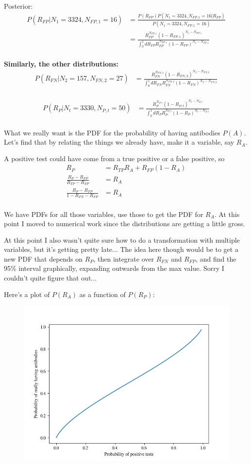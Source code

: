 Posterior:
\begin{align*}
    P(R_{FP}|N_1=3324, N_{FP,1}=16) &= \frac{P(R_{FP}) P(N_1=3324, N_{FP,1}=16 | R_{FP})}{P(N_1=3324, N_{FP,1}=16)} \\
    &= \frac{R_{FP}^{N_{FP,1}} (1-R_{FP,1})^{N_1-N_{FP,1}}}{\int_0^1 dR_{FP} R_{FP}^{N_{FP,1}} (1-R_{FP})^{N_1-N_{FP,1}}} \\
\end{align*}

\textbf{Similarly, the other distributions:}
\begin{align*}
    P(R_{FN}|N_2=157, N_{FN,2}=27) 
    &= \frac{R_{FN}^{N_{FN,2}} (1-R_{FN,2})^{N_2-N_{FN,2}}}{\int_0^1 dR_{FN} R_{FN}^{N_{FN,2}} (1-R_{FN})^{N_2-N_{FN,2}}} \\
\end{align*}

\begin{align*}
    P(R_{P}| N_t=3330, N_{P,t}=50) 
    &= \frac{R_{P}^{N_{P,t}} (1-R_{P,t})^{N_t-N_{P,t}}}{\int_0^1 dR_{P} R_{P}^{N_{P,t}} (1-R_{P})^{N_t-N_{P,t}}} \\
\end{align*}

What we really want is the PDF for the probability of having antibodies $P(A)$. Let's find that by relating the things we already have, make it a variable, say $R_A$.

A positive test could have come from a true positive or a false positive, so
\begin{align*}
    R_{P} &= R_{TP}R_A + R_{FP}(1-R_A) \\
    \frac{R_{P} - R_{FP}}{R_{TP} - R_{FP}} &= R_A  \\
    \frac{R_{P} - R_{FP}}{1-R_{FN} - R_{FP}} &= R_A  \\
\end{align*}

We have PDFs for all those variables, use those to get the PDF for $R_A$. At this point I moved to numerical work since the distributions are getting a little gross.

At this point I also wasn't quite sure how to do a transformation with multiple variables, but it's getting pretty late... The idea here though would be to get a new PDF that depends on $R_P$, then integrate over $R_{FN}$ and $R_{FP}$, and find the 95\% interval graphically, expanding outwards from the max value. Sorry I couldn't quite figure that out...

Here's a plot of $P(R_A)$ as a function of $P(R_P)$:
\begin{figure}[H]
    \includegraphics[width=\textwidth]{q2.png}
\end{figure}
